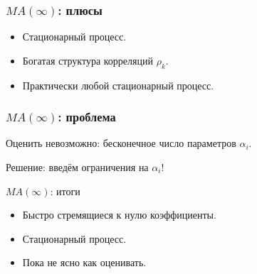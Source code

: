 \begin{frame}
  \frametitle{$MA(\infty)$: плюсы}

  \begin{itemize}[<+->]
    \item \alert{Стационарный} процесс.
    \item Богатая структура корреляций $\rho_k$.
    \item \alert{Практически} любой стационарный процесс. 
  \end{itemize}

\end{frame}


\begin{frame}
    \frametitle{$MA(\infty)$: проблема}


    Оценить невозможно: \alert{бесконечное} число параметров $\alpha_i$. 

    \pause
   Решение: введём \alert{ограничения} на $\alpha_i$!

   \pause
   \pause
   \pause

\end{frame}




\begin{frame}{$MA(\infty)$: итоги}

  \begin{itemize}[<+->]
    \item \alert{Быстро} стремящиеся к нулю коэффициенты. 
    \item \alert{Стационарный процесс}. 
    \item \alert{Пока} не ясно как оценивать.
  \end{itemize}
\end{frame}


